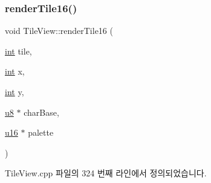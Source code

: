 \subsubsection{\texorpdfstring{render\+Tile16()}{renderTile16()}}
{\footnotesize\ttfamily void Tile\+View\+::render\+Tile16 (\begin{DoxyParamCaption}\item[{\mbox{\hyperlink{_util_8cpp_a0ef32aa8672df19503a49fab2d0c8071}{int}}}]{tile,  }\item[{\mbox{\hyperlink{_util_8cpp_a0ef32aa8672df19503a49fab2d0c8071}{int}}}]{x,  }\item[{\mbox{\hyperlink{_util_8cpp_a0ef32aa8672df19503a49fab2d0c8071}{int}}}]{y,  }\item[{\mbox{\hyperlink{_system_8h_aed742c436da53c1080638ce6ef7d13de}{u8}} $\ast$}]{char\+Base,  }\item[{\mbox{\hyperlink{_system_8h_a9e6c91d77e24643b888dbd1a1a590054}{u16}} $\ast$}]{palette }\end{DoxyParamCaption})}



Tile\+View.\+cpp 파일의 324 번째 라인에서 정의되었습니다.


